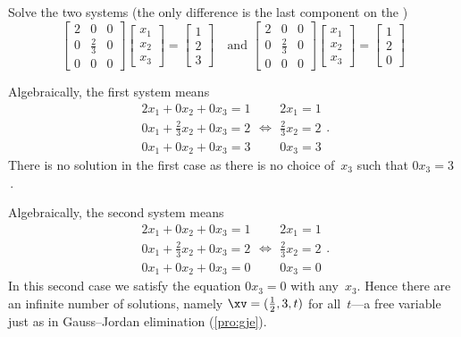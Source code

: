\begin{example} \label{eg:}
Solve the two systems (the only difference is the last component on the \rhs)
\begin{equation*}
\begin{bmatrix} 2&0&0\\0&\frac23&0\\0&0&0 \end{bmatrix}
\begin{bmatrix} x_1\\x_2\\x_3 \end{bmatrix}
=\begin{bmatrix} 1\\2\\3 \end{bmatrix}
\quad\text{and }
\begin{bmatrix} 2&0&0\\0&\frac23&0\\0&0&0 \end{bmatrix}
\begin{bmatrix} x_1\\x_2\\x_3 \end{bmatrix}
=\begin{bmatrix} 1\\2\\0 \end{bmatrix}
\end{equation*}
\begin{solution}
Algebraically, the first system means
\begin{equation*}
\begin{array}{l} 2x_1+0x_2+0x_3=1
\\0x_1+\frac23x_2+0x_3=2
\\0x_1+0x_2+0x_3=3\end{array}
\iff
\begin{array}{l} 2x_1=1
\\\frac23x_2=2
\\0x_3=3\end{array}
.
\end{equation*}
There is no solution in the first case as there is no choice of~\(x_3\) such that \(0x_3=3\)\,.

Algebraically, the second system means
\begin{equation*}
\begin{array}{l} 2x_1+0x_2+0x_3=1
\\0x_1+\frac23x_2+0x_3=2
\\0x_1+0x_2+0x_3=0\end{array}
\iff
\begin{array}{l} 2x_1=1
\\\frac23x_2=2
\\0x_3=0\end{array}
.
\end{equation*}
In this second case we satisfy the equation \(0x_3=0\) with any~\(x_3\).
Hence there are an infinite number of solutions, namely \(\xv=(\frac12,3,t)\) for all~\(t\)---a free variable just as in Gauss--Jordan elimination (\autoref{pro:gje}).
\end{solution}
\end{example}




